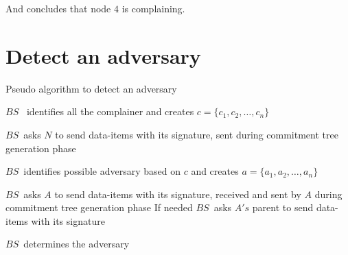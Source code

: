 	And concludes that node $4 $ is complaining.
\newpage
\section{Detect an adversary}
\begin{algorithm}
\caption{Pseudo algorithm to detect an adversary}

	\begin{algorithmic}[1]

			\STATE $BS$ \ identifies all the complainer and creates $c = \{c_{1}, c_{2}, \dotsc, c_{n}\}$

				\STATE $BS$\ asks $N$ to send data-items with its signature, sent during commitment tree generation phase
			
			\ENDFOR

			\STATE $BS$\ identifies possible adversary based on $c$ and creates $a = \{a_{1},a_{2},\dotsc,a_{n}\}$


				\STATE $BS$\ asks $A$ to send data-items with its signature, received and sent by $A$ during commitment tree generation phase
				\STATE If needed $BS$\  asks $A's$ parent to send data-items with its signature
	
			\ENDFOR

			\STATE $BS$\ determines the adversary 

	\end{algorithmic}
\end{algorithm}